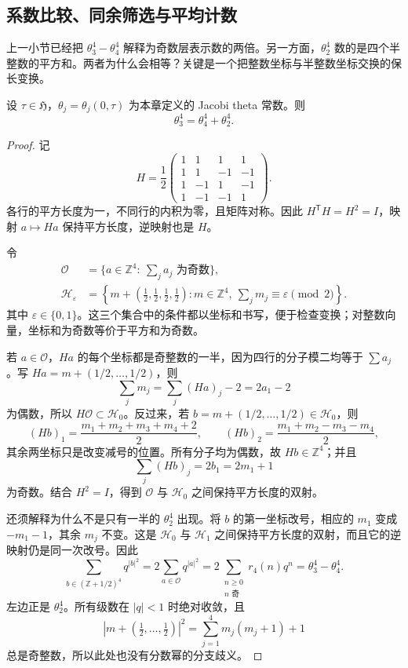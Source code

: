 \subsection{系数比较、同余筛选与平均计数}
\label{b3:subsec:240303}

上一小节已经把 \(\theta_3^4-\theta_4^4\) 解释为奇数层表示数的两倍。另一方面，\(\theta_2^4\) 数的是四个半整数的平方和。两者为什么会相等？关键是一个把整数坐标与半整数坐标交换的保长变换。

\begin{proposition}\label{b3:prop:24-quartic-identity}
设 \(\tau\in\mathfrak H\)，\(\theta_j=\theta_j(0,\tau)\) 为本章定义的 Jacobi theta 常数。则
\begin{equation}\label{b3:eq:24-quartic-identity}
 \theta_3^4=\theta_4^4+\theta_2^4.
\end{equation}
\end{proposition}
\begin{proof}
记
\[
 H=\frac12
 \begin{pmatrix}
 1&1&1&1\\
 1&1&-1&-1\\
 1&-1&1&-1\\
 1&-1&-1&1
 \end{pmatrix}.
\]
各行的平方长度为一，不同行的内积为零，且矩阵对称。因此
\(H^{\mathsf T}H=H^2=I\)，映射 \(a\mapsto Ha\) 保持平方长度，逆映射也是 \(H\)。

令
\[
 \begin{aligned}
 \mathcal O&=\{a\in\mathbb Z^4:\ \textstyle\sum_j a_j\text{ 为奇数}\},\\
 \mathcal H_\varepsilon&=
 \left\{m+\left(\tfrac12,\tfrac12,\tfrac12,\tfrac12\right):
 m\in\mathbb Z^4,\ \textstyle\sum_jm_j\equiv\varepsilon\pmod2\right\}.
 \end{aligned}
\]
其中 \(\varepsilon\in\{0,1\}\)。这三个集合中的条件都以坐标和书写，便于检查变换；对整数向量，坐标和为奇数等价于平方和为奇数。

若 \(a\in\mathcal O\)，\(Ha\) 的每个坐标都是奇整数的一半，因为四行的分子模二均等于 \(\sum a_j\)。写 \(Ha=m+(1/2,\ldots,1/2)\)，则
\[
 \sum_j m_j=\sum_j(Ha)_j-2=2a_1-2
\]
为偶数，所以 \(H\mathcal O\subset\mathcal H_0\)。反过来，若 \(b=m+(1/2,\ldots,1/2)\in\mathcal H_0\)，则
\[
 (Hb)_1=\frac{m_1+m_2+m_3+m_4+2}{2},\qquad
 (Hb)_2=\frac{m_1+m_2-m_3-m_4}{2},
\]
其余两坐标只是改变减号的位置。所有分子均为偶数，故 \(Hb\in\mathbb Z^4\)；并且
\[
 \sum_j(Hb)_j=2b_1=2m_1+1
\]
为奇数。结合 \(H^2=I\)，得到 \(\mathcal O\) 与 \(\mathcal H_0\) 之间保持平方长度的双射。

还须解释为什么不是只有一半的 \(\theta_2^4\) 出现。将 \(b\) 的第一坐标改号，相应的 \(m_1\) 变成 \(-m_1-1\)，其余 \(m_j\) 不变。这是 \(\mathcal H_0\) 与 \(\mathcal H_1\) 之间保持平方长度的双射，而且它的逆映射仍是同一次改号。因此
\[
 \sum_{b\in(\mathbb Z+1/2)^4}q^{|b|^2}
 =2\sum_{a\in\mathcal O}q^{|a|^2}
 =2\sum_{\substack{n\ge0\\n\text{ 奇}}}r_4(n)q^n
 =\theta_3^4-\theta_4^4.
\]
左边正是 \(\theta_2^4\)。所有级数在 \(|q|<1\) 时绝对收敛，且
\[
 \left|m+\left(\tfrac12,\ldots,\tfrac12\right)\right|^2
 =\sum_{j=1}^4m_j(m_j+1)+1
\]
总是奇整数，所以此处也没有分数幂的分支歧义。
\end{proof}

